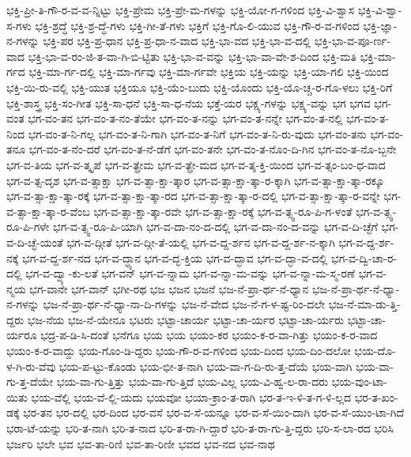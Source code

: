 {ಭಕ್ತಿ-ಪ್ರೀ-ತಿ-ಗೌ-ರ-ವ-ವ-ನ್ನಿಟ್ಟು
ಭಕ್ತಿ-ಪ್ರೇಮ
ಭಕ್ತಿ-ಪ್ರೇ-ಮ-ಗಳನ್ನು
ಭಕ್ತಿ-ಯೋ-ಗ-ಗಳಿಂದ
ಭಕ್ತಿ-ವಿ-ಶ್ವಾಸ
ಭಕ್ತಿ-ವಿ-ಶ್ವಾ-ಸ-ಗಳು
ಭಕ್ತಿ-ಶ್ರದ್ಧೆ
ಭಕ್ತಿ-ಶ್ರ-ದ್ಧೆ-ಗಳು
ಭಕ್ತಿ-ಗೀ-ತೆ-ಗಳು
ಭಕ್ತಿಗೆ
ಭಕ್ತಿ-ಗೊ-ಲಿ-ಯುವ
ಭಕ್ತಿ-ಗೌ-ರ-ವ-ಗಳಿಂದ
ಭಕ್ತಿ-ಜ್ಞಾ-ನ-ಗಳನ್ನು
ಭಕ್ತಿ-ಪರ
ಭಕ್ತಿ-ಪ್ರ-ಧಾನ
ಭಕ್ತಿ-ಪ್ರ-ಧಾ-ನ-ವಾದ
ಭಕ್ತಿ-ಭಾ-ವದ
ಭಕ್ತಿ-ಭಾ-ವ-ದಲ್ಲಿ
ಭಕ್ತಿ-ಭಾ-ವ-ಪೂ-ರ್ಣ-ವಾದ
ಭಕ್ತಿ-ಭಾ-ವ-ರಂ-ಜಿ-ತ-ವಾ-ಗಿ-ಬಿ-ಟ್ಟಿತು
ಭಕ್ತಿ-ಭಾ-ವ-ವನ್ನು
ಭಕ್ತಿ-ಭಾ-ವಾ-ವೇ-ಶ-ದಿಂದ
ಭಕ್ತಿ-ಮತಿ
ಭಕ್ತಿ-ಮಾ-ರ್ಗದ
ಭಕ್ತಿ-ಮಾ-ರ್ಗ-ದಲ್ಲಿ
ಭಕ್ತಿ-ಮಾ-ರ್ಗವು
ಭಕ್ತಿ-ಮಾ-ರ್ಗವೇ
ಭಕ್ತಿಯ
ಭಕ್ತಿ-ಯನ್ನು
ಭಕ್ತಿ-ಯಾ-ಗಲಿ
ಭಕ್ತಿ-ಯಿಂದ
ಭಕ್ತಿ-ಯಿ-ರು-ವಲ್ಲಿ
ಭಕ್ತಿ-ಯುತ
ಭಕ್ತಿಯೂ
ಭಕ್ತಿ-ಯೆಂ-ಬುದು
ಭಕ್ತಿ-ಯೊಂದು
ಭಕ್ತಿ-ಯೊ-ಚ್ಚ-ರ-ಗೊ-ಳಲು
ಭಕ್ತಿ-ರಿಗೆ
ಭಕ್ತಿ-ಶಾಸ್ತ್ರ
ಭಕ್ತಿ-ಸಂ-ಗೀತ
ಭಕ್ತಿ-ಸಾ-ಧನೆ
ಭಕ್ತಿ-ಸಾ-ಧ-ನೆಯ
ಭಕ್ತೆ-ಯರ
ಭಕ್ಷ್ಯ-ಗಳನ್ನು
ಭಕ್ಷ್ಯ-ವನ್ನು
ಭಗ
ಭಗವ
ಭಗ-ವಂತ
ಭಗ-ವಂ-ತನ
ಭಗ-ವಂ-ತ-ನಂ-ತೆಯೇ
ಭಗ-ವಂ-ತ-ನನ್ನು
ಭಗ-ವಂ-ತ-ನನ್ನೇ
ಭಗ-ವಂ-ತ-ನಲ್ಲಿ
ಭಗ-ವಂ-ತ-ನಿಂದ
ಭಗ-ವಂ-ತ-ನಿ-ಗಲ್ಲ
ಭಗ-ವಂ-ತ-ನಿ-ಗಾಗಿ
ಭಗ-ವಂ-ತ-ನಿಗೆ
ಭಗ-ವಂ-ತ-ನಿ-ರು-ವುದು
ಭಗ-ವಂ-ತನು
ಭಗ-ವಂ-ತನೂ
ಭಗ-ವಂ-ತ-ನೆಂ-ದರೆ
ಭಗ-ವಂ-ತ-ನೆ-ಡೆಗೆ
ಭಗ-ವಂ-ತನೇ
ಭಗ-ವಂ-ತ-ನೊಂ-ದಿ-ಗಿನ
ಭಗ-ವಂ-ತ-ನೊ-ಬ್ಬನೇ
ಭಗ-ವ-ತಿಯ
ಭಗ-ವ-ತ್ಕೃಪೆ
ಭಗ-ವ-ತ್ಪ್ರೇಮ
ಭಗ-ವ-ತ್ಪ್ರೇ-ಮದ
ಭಗ-ವ-ತ್ಶ-ಕ್ತಿ-ಯಿಂದ
ಭಗ-ವ-ತ್ಸಂ-ಬಂ-ಧ-ವಾದ
ಭಗ-ವ-ತ್ಸ-ದೃಶ
ಭಗ-ವ-ತ್ಸಾಕ್ಷಾ
ಭಗ-ವ-ತ್ಸಾ-ಕ್ಷಾ-ತ್ಕಾರ
ಭಗ-ವ-ತ್ಸಾ-ಕ್ಷಾ-ತ್ಕಾ-ರ-ಕ್ಕಾಗಿ
ಭಗ-ವ-ತ್ಸಾ-ಕ್ಷಾ-ತ್ಕಾ-ರಕ್ಕೂ
ಭಗ-ವ-ತ್ಸಾ-ಕ್ಷಾ-ತ್ಕಾ-ರಕ್ಕೆ
ಭಗ-ವ-ತ್ಸಾ-ಕ್ಷಾ-ತ್ಕಾ-ರದ
ಭಗ-ವ-ತ್ಸಾ-ಕ್ಷಾ-ತ್ಕಾ-ರ-ದಲ್ಲಿ
ಭಗ-ವ-ತ್ಸಾ-ಕ್ಷಾ-ತ್ಕಾ-ರ-ವನ್ನೇ
ಭಗ-ವ-ತ್ಸಾ-ಕ್ಷಾ-ತ್ಕಾ-ರ-ವೆಂಬ
ಭಗ-ವ-ತ್ಸಾ-ಕ್ಷಾ-ತ್ಕಾ-ರವೇ
ಭಗ-ವ-ತ್ಸಾ-ಕ್ಷಾ-ರಕ್ಕೆ
ಭಗ-ವ-ತ್ಸ್ವ-ರೂ-ಪಿ-ಗ-ಳಂತೆ
ಭಗ-ವ-ತ್ಸ್ವ-ರೂ-ಪಿ-ಗಳೇ
ಭಗ-ವ-ತ್ಸ್ವ-ರೂ-ಪಿ-ಯಾಗಿ
ಭಗ-ವ-ದಾ-ನಂ-ದ-ದಲ್ಲಿ
ಭಗ-ವ-ದಾ-ನಂ-ದ-ವನ್ನು
ಭಗ-ವ-ದಿ-ಚ್ಛೆಗೆ
ಭಗ-ವ-ದಿ-ಚ್ಛೆ-ಯಂತೆ
ಭಗ-ವ-ದ್ಗೀತೆ
ಭಗ-ವ-ದ್ಗೀ-ತೆ-ಯಲ್ಲಿ
ಭಗ-ವ-ದ್ದ-ರ್ಶನ
ಭಗ-ವ-ದ್ದ-ರ್ಶ-ನ-ಕ್ಕಾಗಿ
ಭಗ-ವ-ದ್ದ-ರ್ಶ-ನಕ್ಕೆ
ಭಗ-ವ-ದ್ದ-ರ್ಶ-ನದ
ಭಗ-ವ-ದ್ಧ್ಯಾನ
ಭಗ-ವ-ದ್ಭ-ಕ್ತಿಯ
ಭಗ-ವ-ದ್ಭಾವ
ಭಗ-ವ-ದ್ಭಾ-ವ-ದಲ್ಲಿ
ಭಗ-ವ-ದ್ವಿ-ಚಾ-ರ-ದಲ್ಲಿ
ಭಗ-ವ-ದ್ವ್ಯಾ-ಕು-ಲತೆ
ಭಗ-ವನ್
ಭಗ-ವ-ನ್ನಾಮ
ಭಗ-ವ-ನ್ನಾ-ಮ-ವನ್ನು
ಭಗ-ವ-ನ್ನಾ-ಮ-ಸ್ಮ-ರಣೆ
ಭಗ-ವ-ನ್ಮಯ
ಭಗ-ವಾನೇ
ಭಗ-ವಾನ್
ಭಗೀ-ರಥ
ಭಜ
ಭಜನ
ಭಜನೆ
ಭಜ-ನೆ-ಪ್ರಾ-ರ್ಥ-ನೆ-ಧ್ಯಾನ
ಭಜ-ನೆ-ಪ್ರಾ-ರ್ಥ-ನೆ-ಧ್ಯಾ-ನ-ಗಳನ್ನು
ಭಜ-ನೆ-ಪ್ರಾ-ರ್ಥ-ನೆ-ಧ್ಯಾ-ನಾ-ದಿ-ಗಳನ್ನು
ಭಜ-ನೆ-ವೇದ
ಭಜ-ನೆ-ಗ-ಳ-ಷ್ಟ-ರಿಂ-ದಲೇ
ಭಜ-ನೆ-ಮಾ-ಡು-ತ್ತಿ-ದ್ದರು
ಭಜ-ನೆಯ
ಭಜ-ನೆ-ಯೇನೂ
ಭಟರು
ಭಟ್ಟಾ-ಚಾರ್ಯ
ಭಟ್ಟಾ-ಚಾ-ರ್ಯರ
ಭಟ್ಟಾ-ಚಾ-ರ್ಯರು
ಭಟ್ಟಾ-ಚಾ-ರ್ಯರೂ
ಭದ್ರ-ಪ-ಡಿ-ಸಿ-ದಂತೆ
ಭನೆಗೂ
ಭಯ
ಭಯ
ಭಯಂ-ಕರ
ಭಯಂ-ಕ-ರ-ವಾ-ಗಿತ್ತು
ಭಯಂ-ಕ-ರ-ವಾದ
ಭಯಂ-ಕ-ರ-ವಾದ್ದು
ಭಯ-ಗೊಂ-ಡಿ-ದ್ದರು
ಭಯ-ಗೌ-ರ-ವ-ಗಳಿಂದ
ಭಯ-ದಿಂದ
ಭಯ-ದಿಂ-ದಲೋ
ಭಯ-ದೊ-ಳ-ಗಿ-ರು-ವೆವು
ಭಯ-ಪ-ಟ್ಟು-ಕೊಂಡು
ಭಯ-ಭೀ-ತ-ನಾಗಿ
ಭಯ-ವಾ-ಗ-ದಿ-ರು-ತ್ತ-ದೆಯೆ
ಭಯ-ವಾಗಿ
ಭಯ-ವಾ-ಗು-ತ್ತ-ದೆಯೇ
ಭಯ-ವಾ-ಗು-ತ್ತಿತ್ತು
ಭಯ-ವಾ-ಗು-ತ್ತಿದೆ
ಭಯ-ವಿಲ್ಲ
ಭಯ-ವಿ-ಹ್ವ-ಲ-ರಾ-ದರು
ಭಯ-ವುಂ-ಟಾ-ಯಿತು
ಭಯ-ವೆಲ್ಲಿ
ಭಯ-ವೆ-ಲ್ಲಿ-ಯದು
ಭಯವೋ
ಭಯಾ-ಕ್ರಾಂ-ತ-ರಾಗಿ
ಭರ-ತ-ಇ-ಳಿ-ತ-ಗ-ಳಿ-ಲ್ಲದ
ಭರ-ತ-ಖಂ-ಡಕ್ಕೆ
ಭರ-ತನ
ಭರ-ದಲ್ಲಿ
ಭರ-ದಿಂದ
ಭರ-ವಸೆ
ಭರ-ವ-ಸೆ-ಯನ್ನೂ
ಭರ-ವ-ಸೆ-ಯಿಂ-ದಾಗಿ
ಭರ-ವ-ಸೆ-ಯುಂ-ಟಾ-ಗಿದೆ
ಭರಾ-ಟೆ-ಯನ್ನು
ಭರಿ-ತ-ನಾಗಿ
ಭರಿ-ತ-ನಾದ
ಭರಿ-ತ-ರಾ-ಗಿ-ದ್ದಾರೆ
ಭರಿ-ತ-ರಾ-ಗು-ತ್ತಿ-ದ್ದರು
ಭರಿ-ಸ-ಲಾ-ರದ
ಭರಿಸಿ
ಭರ್ಜರಿ
ಭಲೇ
ಭವ
ಭವ-ತಾ-ರಿಣಿ
ಭವ-ತಾ-ರಿಣೀ
ಭವದ
ಭವ-ನದ
ಭವ-ನಾಥ
}
